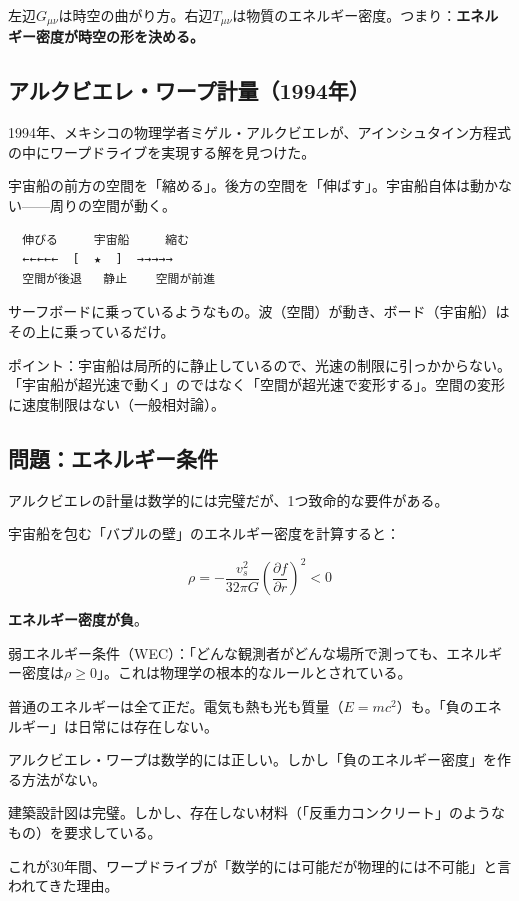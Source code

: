 \documentclass[12pt,a4paper]{article}
\begin{document}
左辺$G_{\mu\nu}$は時空の曲がり方。右辺$T_{\mu\nu}$は物質のエネルギー密度。つまり：\textbf{エネルギー密度が時空の形を決める。}

\subsection{アルクビエレ・ワープ計量（1994年）}

1994年、メキシコの物理学者ミゲル・アルクビエレが、アインシュタイン方程式の中にワープドライブを実現する解を見つけた。

\begin{physbox}
宇宙船の前方の空間を「縮める」。後方の空間を「伸ばす」。宇宙船自体は動かない——周りの空間が動く。

\begin{verbatim}
  伸びる     宇宙船     縮む
  ←←←←←  [  ★  ]  →→→→→
  空間が後退   静止    空間が前進
\end{verbatim}

サーフボードに乗っているようなもの。波（空間）が動き、ボード（宇宙船）はその上に乗っているだけ。

ポイント：宇宙船は局所的に静止しているので、光速の制限に引っかからない。「宇宙船が超光速で動く」のではなく「空間が超光速で変形する」。空間の変形に速度制限はない（一般相対論）。
\end{physbox}

\subsection{問題：エネルギー条件}

アルクビエレの計量は数学的には完璧だが、1つ致命的な要件がある。

宇宙船を包む「バブルの壁」のエネルギー密度を計算すると：

$$\rho = -\frac{v_s^2}{32\pi G}\left(\frac{\partial f}{\partial r}\right)^2 < 0$$

\textbf{エネルギー密度が負}。

弱エネルギー条件（WEC）：「どんな観測者がどんな場所で測っても、エネルギー密度は$\rho \geq 0$」。これは物理学の根本的なルールとされている。

普通のエネルギーは全て正だ。電気も熱も光も質量（$E=mc^2$）も。「負のエネルギー」は日常には存在しない。

\begin{storybox}[ワープの材料がない]
アルクビエレ・ワープは数学的には正しい。しかし「負のエネルギー密度」を作る方法がない。

建築設計図は完璧。しかし、存在しない材料（「反重力コンクリート」のようなもの）を要求している。

これが30年間、ワープドライブが「数学的には可能だが物理的には不可能」と言われてきた理由。
\end{storybox}
\end{document}

